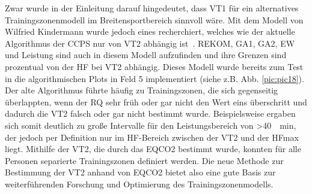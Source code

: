Zwar wurde in der Einleitung darauf hingedeutet, dass VT1 für ein alternatives Trainingszonenmodell im Breitensportbereich sinnvoll wäre. Mit dem Modell von Wilfried Kindermann wurde jedoch eines recherchiert, welches wie der aktuelle Algorithmus der \acs{CCPS} nur von VT2 abhängig ist~\cite{Kindermann.2004}. \acs{REKOM}, \acs{GA1}, \acs{GA2}, \acs{EW} und Leistung sind auch in diesem Modell aufzufinden und ihre Grenzen sind prozentual von der \acs{HF} bei VT2 abhängig. Dieses Modell wurde bereits zum Test in die algorithmischen Plots in Feld 5 implementiert (siehe z.B. Abb. \ref{pic:pic18}). Der alte Algorithmus führte häufig zu Trainingszonen, die sich gegenseitig überlappten, wenn der RQ sehr früh oder gar nicht den Wert eins überschritt und dadurch die VT2 falsch oder gar nicht bestimmt wurde. Beispielsweise ergaben sich somit deutlich zu große Intervalle für den Leistungsbereich von >\SI{40}{\per\minute}, der jedoch per Definition nur im \acs{HF}-Bereich zwischen der VT2 und der \acs{HFmax} liegt. Mithilfe der VT2, die durch das \acs{EQCO2} bestimmt wurde, konnten für alle Personen separierte Trainingszonen definiert werden. Die neue Methode zur Bestimmung der VT2 anhand von \acs{EQCO2} bietet also eine gute Basis zur weiterführenden Forschung und Optimierung des Trainingszonenmodells.

